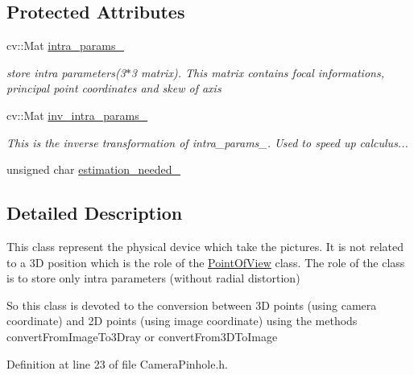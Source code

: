 \subsection*{Protected Attributes}
\begin{DoxyCompactItemize}
\item 
\hypertarget{class_opencv_sf_m_1_1_camera_pinhole_ac60a2fb4ca15534d0b361628837f9286}{
cv::Mat \hyperlink{class_opencv_sf_m_1_1_camera_pinhole_ac60a2fb4ca15534d0b361628837f9286}{intra\_\-params\_\-}}
\label{class_opencv_sf_m_1_1_camera_pinhole_ac60a2fb4ca15534d0b361628837f9286}

\begin{DoxyCompactList}\small\item\em store intra parameters(3$\ast$3 matrix). This matrix contains focal informations, principal point coordinates and skew of axis \end{DoxyCompactList}\item 
\hypertarget{class_opencv_sf_m_1_1_camera_pinhole_ad6bf92278db0c35e220accd087a05701}{
cv::Mat \hyperlink{class_opencv_sf_m_1_1_camera_pinhole_ad6bf92278db0c35e220accd087a05701}{inv\_\-intra\_\-params\_\-}}
\label{class_opencv_sf_m_1_1_camera_pinhole_ad6bf92278db0c35e220accd087a05701}

\begin{DoxyCompactList}\small\item\em This is the inverse transformation of intra\_\-params\_\-. Used to speed up calculus... \end{DoxyCompactList}\item 
unsigned char \hyperlink{class_opencv_sf_m_1_1_camera_pinhole_a024b01688fee19c5c2d592f4060d6063}{estimation\_\-needed\_\-}
\end{DoxyCompactItemize}


\subsection{Detailed Description}
This class represent the physical device which take the pictures. It is not related to a 3D position which is the role of the \hyperlink{class_opencv_sf_m_1_1_point_of_view}{PointOfView} class. The role of the class is to store only intra parameters (without radial distortion) 

So this class is devoted to the conversion between 3D points (using camera coordinate) and 2D points (using image coordinate) using the methods convertFromImageTo3Dray or convertFrom3DToImage 

Definition at line 23 of file CameraPinhole.h.



